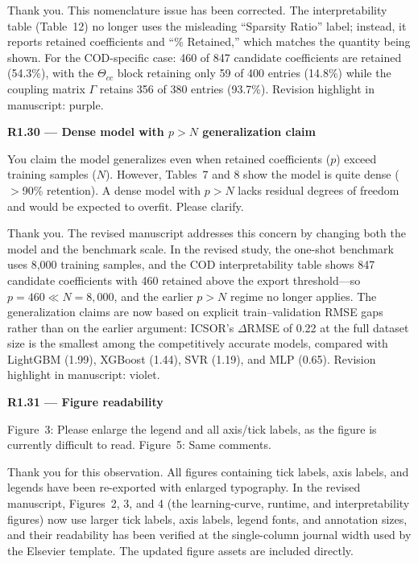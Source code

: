 \documentclass[a4paper,11pt]{article}
\newcommand{\reviewlabel}[1]{\noindent\textbf{\textcolor{accentblue}{#1}}\par\medskip}
\newcommand{\revhighlight}[2]{\textcolor{#1}{Revision highlight in manuscript: #2.}}
\begin{document}
Thank you. This nomenclature issue has been corrected. The interpretability table (Table~12) no longer uses the misleading ``Sparsity Ratio'' label; instead, it reports retained coefficients and ``\% Retained,'' which matches the quantity being shown. For the COD-specific case: 460 of 847 candidate coefficients are retained (54.3\%), with the $\Theta_{cc}$ block retaining only 59 of 400 entries (14.8\%) while the coupling matrix $\Gamma$ retains 356 of 380 entries (93.7\%). \revhighlight{revRtwoOne}{purple}

\reviewlabel{R1.30 --- Dense model with $p > N$ generalization claim}
\begin{reviewbox}
You claim the model generalizes even when retained coefficients ($p$) exceed training samples ($N$). However, Tables~7 and 8 show the model is quite dense ($>$90\% retention). A dense model with $p > N$ lacks residual degrees of freedom and would be expected to overfit. Please clarify.
\end{reviewbox}

Thank you. The revised manuscript addresses this concern by changing both the model and the benchmark scale. In the revised study, the one-shot benchmark uses 8,000 training samples, and the COD interpretability table shows 847 candidate coefficients with 460 retained above the export threshold---so $p = 460 \ll N = 8{,}000$, and the earlier $p > N$ regime no longer applies. The generalization claims are now based on explicit train--validation RMSE gaps rather than on the earlier argument: ICSOR's $\Delta$RMSE of 0.22 at the full dataset size is the smallest among the competitively accurate models, compared with LightGBM (1.99), XGBoost (1.44), SVR (1.19), and MLP (0.65). \revhighlight{revRtwoFive}{violet}

\reviewlabel{R1.31 --- Figure readability}
\begin{reviewbox}
Figure~3: Please enlarge the legend and all axis/tick labels, as the figure is currently difficult to read. Figure~5: Same comments.
\end{reviewbox}

Thank you for this observation. All figures containing tick labels, axis labels, and legends have been re-exported with enlarged typography. In the revised manuscript, Figures~2, 3, and 4 (the learning-curve, runtime, and interpretability figures) now use larger tick labels, axis labels, legend fonts, and annotation sizes, and their readability has been verified at the single-column journal width used by the Elsevier template. The updated figure assets are included directly.
\end{document}
